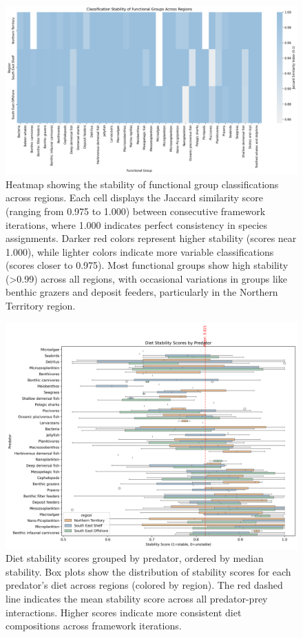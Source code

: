\begin{figure}[htbp]
    \centering
    \includegraphics[width=\textwidth]{figures/group_stability_heatmap.png}
    \caption{Heatmap showing the stability of functional group classifications across regions. Each cell displays the Jaccard similarity score (ranging from 0.975 to 1.000) between consecutive framework iterations, where 1.000 indicates perfect consistency in species assignments. Darker red colors represent higher stability (scores near 1.000), while lighter colors indicate more variable classifications (scores closer to 0.975). Most functional groups show high stability (>0.99) across all regions, with occasional variations in groups like benthic grazers and deposit feeders, particularly in the Northern Territory region.}
    \label{fig:stability_heatmap_supp}
\end{figure}

\begin{figure}[htbp]
  \centering
  \includegraphics[width=\textwidth]{figures/predator_stability_boxplots.png}
  \caption{Diet stability scores grouped by predator, ordered by median stability. Box plots show the distribution of stability scores for each predator's diet across regions (colored by region). The red dashed line indicates the mean stability score across all predator-prey interactions. Higher scores indicate more consistent diet compositions across framework iterations.}
  \label{fig:predator_stability}
\end{figure}



